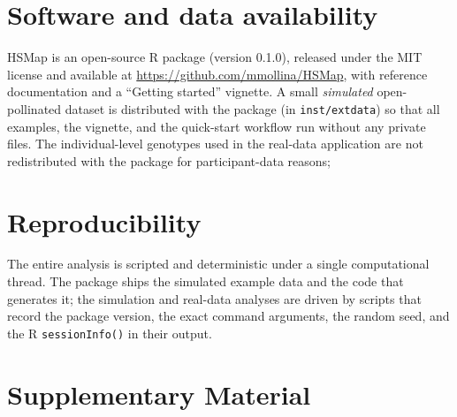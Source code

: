 \documentclass[11pt]{article}
\begin{document}
\section{Software and data availability}\label{sec:availability}
\textsf{HSMap} is an open-source \textsf{R} package (version 0.1.0), released under the MIT
license and available at \url{https://github.com/mmollina/HSMap}, with reference
documentation and a ``Getting started'' vignette. A small \emph{simulated}
open-pollinated dataset is distributed with the package (in \texttt{inst/extdata}) so that
all examples, the vignette, and the quick-start workflow run without any private files.
The individual-level genotypes used in the real-data application are not redistributed
with the package for participant-data reasons; %

\section*{Reproducibility}\label{sec:reproducibility}
The entire analysis is scripted and deterministic under a single computational thread. The
package ships the simulated example data and the code that generates it; the simulation
and real-data analyses are driven by scripts that record the package version, the exact
command arguments, the random seed, and the \textsf{R} \texttt{sessionInfo()} in their
output. %

\section{Supplementary Material} \label{sec:sup_mat}
\end{document}
